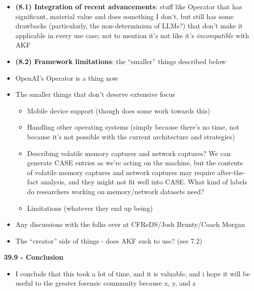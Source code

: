 \begin{itemize}
\item
  \textbf{(8.1) Integration of recent advancements}: stuff like Operator
  that has significant, material value and does something I don't, but
  still has some drawbacks (particularly, the non-determinism of LLMs?)
  that don't make it applicable in every use case; not to mention it's
  not like it's \emph{incompatible} with AKF
\item
  \textbf{(8.2) Framework limitations}: the ``smaller'' things described
  below
\item
  OpenAI's Operator is a thing now
\item
  The smaller things that don't deserve extensive focus

  \begin{itemize}
  \tightlist
  \item
    Mobile device support (though
    \cite{demmelDataSynthesisGoing2024} does some work towards this)
  \item
    Handling other operating systems (simply because there's no time,
    not because it's not possible with the current architecture and
    strategies)
  \item
    Describing volatile memory captures and network captures? We can
    generate CASE entries as we're acting on the machine, but the
    contents of volatile memory captures and network captures may
    require after-the-fact analysis, and they might not fit well into
    CASE. What kind of labels do researchers working on memory/network
    datasets need?
  \item
    Limitations (whatever they end up being)
  \end{itemize}
\item
  Any discussions with the folks over at CFReDS/Josh Brunty/Coach Morgan
\item
  The ``creator'' side of things - does AKF suck to use? (see 7.2)
\end{itemize}

\textbf{39.9 - Conclusion}

\begin{itemize}
\tightlist
\item
  I conclude that this took a lot of time, and it is valuable, and i
  hope it will be useful to the greater forensic community because x, y,
  and z
\end{itemize}
